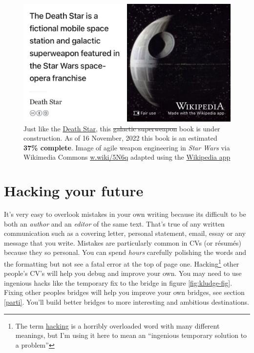 \documentclass[
]{book}
\begin{document}
\begin{figure}

{\centering \includegraphics[width=0.99\linewidth]{images/DeathStar2} 

}

\caption{Just like the \href{https://en.wikipedia.org/wiki/Death_Star}{Death Star}, this \sout{galactic superweapon} book is under construction. As of 16 November, 2022 this book is an estimated \textbf{37\% complete}. Image of agile weapon engineering in \emph{Star Wars} via Wikimedia Commons \href{https://w.wiki/5N6q}{w.wiki/5N6q} adapted using the \href{https://apps.apple.com/gb/app/wikipedia/id324715238}{Wikipedia app}}\label{fig:deathstar19-fig}
\end{figure}

\hypertarget{hacking}{%
\chapter{Hacking your future}\label{hacking}}

It's very easy to overlook mistakes in your own writing because its difficult to be both an \emph{author} and an \emph{editor} of the same text. That's true of any written communication such as a covering letter, personal statement, email, essay or any message that you write. Mistakes are particularly common in CVs (or résumés) because they so personal. You can spend \emph{hours} carefully polishing the words and the formatting but not see a fatal error at the top of page one. Hacking\footnote{The term \href{https://en.wikipedia.org/wiki/Hacker_(disambiguation)}{hacking} is a horribly overloaded word with many different meanings, but I'm using it here to mean an ``ingenious temporary solution to a problem''} other people's CV's will help you debug and improve your own. You may need to use ingenious hacks like the temporary fix to the bridge in figure \ref{fig:kludge-fig}. Fixing other peoples bridges will help you improve your own bridges, see section \ref{parti}. You'll build better bridges to more interesting and ambitious destinations.
\end{document}
